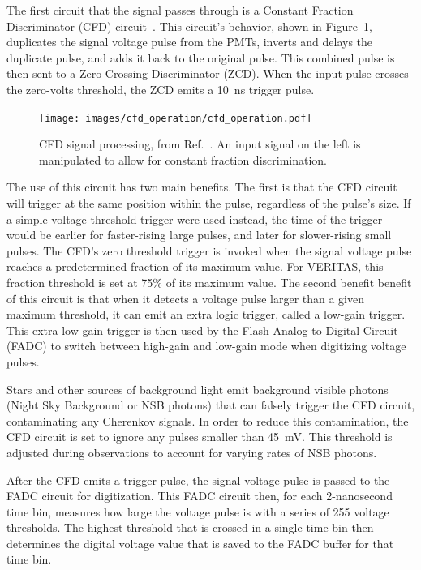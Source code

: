 The first circuit that the signal passes through is a Constant Fraction Discriminator (CFD) circuit~\cite{cfd_behavior}.
This circuit's behavior, shown in Figure~\ref{fig:cfd_operation}, duplicates the signal voltage pulse from the PMTs, inverts and delays the duplicate pulse, and adds it back to the original pulse.
This combined pulse is then sent to a Zero Crossing Discriminator (ZCD).
When the input pulse crosses the zero-volts threshold, the ZCD emits a \SI{10}{ns} trigger pulse.

\begin{figure}[ht]
  \centering
  \texttt{[image: images/cfd\_operation/cfd\_operation.pdf]}
  \caption[CFD Operation]{
    CFD signal processing, from Ref.~\cite{cfd_operation}.
    An input signal on the left is manipulated to allow for constant fraction discrimination.
  }
  \label{fig:cfd_operation}
\end{figure}

The use of this circuit has two main benefits.
The first is that the CFD circuit will trigger at the same position within the pulse, regardless of the pulse's size.
If a simple voltage-threshold trigger were used instead, the time of the trigger would be earlier for faster-rising large pulses, and later for slower-rising small pulses.
The CFD's zero threshold trigger is invoked when the signal voltage pulse reaches a predetermined fraction of its maximum value.
For VERITAS, this fraction threshold is set at 75\% of its maximum value.
The second benefit benefit of this circuit is that when it detects a voltage pulse larger than a given maximum threshold, it can emit an extra logic trigger, called a low-gain trigger.
This extra low-gain trigger is then used by the Flash Analog-to-Digital Circuit (FADC) to switch between high-gain and low-gain mode when digitizing voltage pulses.

Stars and other sources of background light emit background visible photons (Night Sky Background or NSB photons) that can falsely trigger the CFD circuit, contaminating any Cherenkov signals.
In order to reduce this contamination, the CFD circuit is set to ignore any pulses smaller than \SI{45}{mV}.
This threshold is adjusted during observations to account for varying rates of NSB photons.

After the CFD emits a trigger pulse, the signal voltage pulse is passed to the FADC circuit for digitization.
This FADC circuit then, for each 2-nanosecond time bin, measures how large the voltage pulse is with a series of 255 voltage thresholds.
The highest threshold that is crossed in a single time bin then determines the digital voltage value that is saved to the FADC buffer for that time bin.

